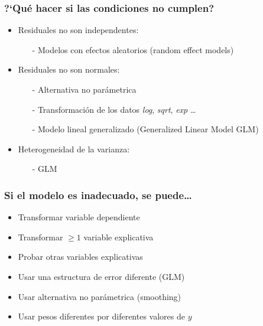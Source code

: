\documentclass[gray,handout,mathserif]{beamer}
\begin{document}
\begin{frame}[label=assumcheck3]
   \frametitle{?`Qu\'e hacer si las condiciones no cumplen?}
    \begin{itemize}[<+-| visible@+-| handout:1>]
      \item Residuales no son independentes:
         \begin{itemize}
            \item[-] Modelos con efectos aleatorios (random effect models)
         \end{itemize}
      \item Residuales no son normales: 
         \begin{itemize}
            \item[-] Alternativa no par\'ametrica
            \item[-] Transformaci\'on de los datos \emph{log}, \emph{sqrt}, \emph{exp} \ldots
            \item[-] Modelo lineal generalizado (Generalized Linear Model GLM)
         \end{itemize}
      \item Heterogeneidad de la varianza:
         \begin{itemize}
            \item[-] GLM
         \end{itemize}
   \end{itemize}
\end{frame}%

 
\begin{frame}[label=modcrit2]
   \frametitle{Si el modelo es inadecuado, se puede\ldots}
    \begin{itemize}
      \item Transformar variable dependiente
      \item Transformar $\geq1$ variable explicativa
      \item Probar otras variables explicativas
      \item Usar una estructura de error diferente (GLM)
      \item Usar alternativa no par\'ametrica (smoothing)
      \item Usar pesos diferentes por diferentes valores de $y$
   \end{itemize}
\end{frame}%
\end{document}
